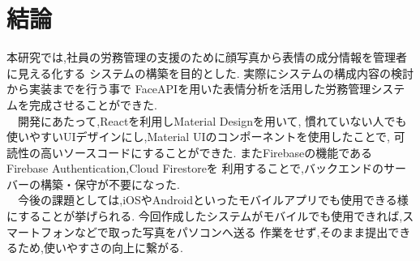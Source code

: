 \chapter{結論}
\label {chp:tex_basic}
本研究では,社員の労務管理の支援のために顔写真から表情の成分情報を管理者に見える化する
システムの構築を目的とした. 実際にシステムの構成内容の検討から実装までを行う事で
FaceAPIを用いた表情分析を活用した労務管理システムを完成させることができた. \\
　開発にあたって,Reactを利用しMaterial Designを用いて,
慣れていない人でも使いやすいUIデザインにし,Material UIのコンポーネントを使用したことで,
可読性の高いソースコードにすることができた.
またFirebaseの機能である Firebase Authentication,Cloud Firestoreを
利用することで,バックエンドのサーバーの構築・保守が不要になった. \\
　今後の課題としては,iOSやAndroidといったモバイルアプリでも使用できる様にすることが挙げられる.
今回作成したシステムがモバイルでも使用できれば,スマートフォンなどで取った写真をパソコンへ送る
作業をせず,そのまま提出できるため,使いやすさの向上に繋がる.
